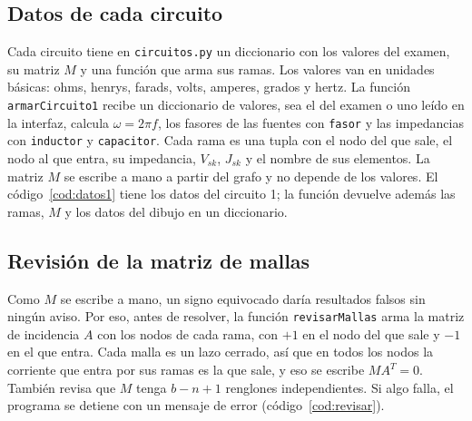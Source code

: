 \documentclass[12pt, letterpaper]{article}
\begin{document}
\subsection{Datos de cada circuito}

Cada circuito tiene en \texttt{circuitos.py} un diccionario con los valores del examen, su matriz $M$ y una función que
arma sus ramas. Los valores van en unidades básicas: ohms, henrys, farads, volts, amperes, grados y hertz. La función
\texttt{armarCircuito1} recibe un diccionario de valores, sea el del examen o uno leído en la interfaz, calcula
$\omega = 2\pi f$, los fasores de las fuentes con \texttt{fasor} y las impedancias con \texttt{inductor} y
\texttt{capacitor}. Cada rama es una tupla con el nodo del que sale, el nodo al que entra, su impedancia, $V_{sk}$,
$J_{sk}$ y el nombre de sus elementos. La matriz $M$ se escribe a mano a partir del grafo y no depende de los valores.
El código~\ref{cod:datos1} tiene los datos del circuito 1; la función devuelve además las ramas, $M$ y los datos del
dibujo en un diccionario.



\subsection{Revisión de la matriz de mallas}

Como $M$ se escribe a mano, un signo equivocado daría resultados falsos sin ningún aviso. Por eso, antes de resolver,
la función \texttt{revisarMallas} arma la matriz de incidencia $A$ con los nodos de cada rama, con $+1$ en el nodo del
que sale y $-1$ en el que entra. Cada malla es un lazo cerrado, así que en todos los nodos la corriente que entra por
sus ramas es la que sale, y eso se escribe $M A^T = 0$. También revisa que $M$ tenga $b - n + 1$ renglones
independientes. Si algo falla, el programa se detiene con un mensaje de error (código~\ref{cod:revisar}).
\end{document}
